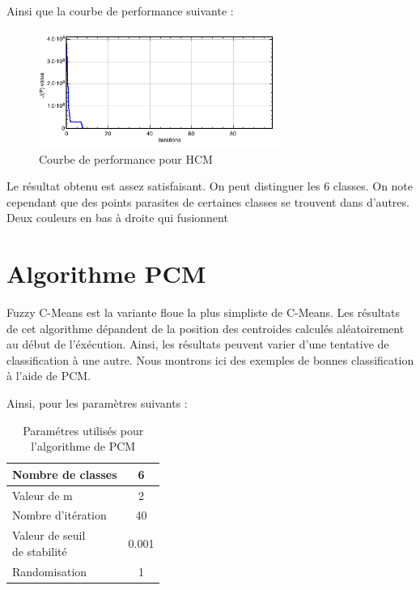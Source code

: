 \documentclass[a4paper,11pt]{article}
\begin{document}
Ainsi que la courbe de performance suivante :

\begin{figure}[H]
\begin{center}
\includegraphics[width=300px]{../img/Perf_HCM.png}
\end{center}
\caption{Courbe de performance pour HCM}
\end{figure}

Le résultat obtenu est assez satisfaisant. On peut distinguer les 6 classes. On note cependant que des points parasites de certaines classes se trouvent dans d'autres. Deux couleurs en bas à droite qui fusionnent

\section{Algorithme PCM}
Fuzzy C-Means est la variante floue la plus simpliste de C-Means. Les résultats de cet algorithme dépandent de la position des centroides calculés aléatoirement au début de l'éxécution. Ainsi, les résultats peuvent varier d'une tentative de classification à une autre. Nous montrons ici des exemples de bonnes classification à l'aide de PCM.

Ainsi, pour les paramètres suivants : 

\begin{table}[H]
  \begin{center}
    \begin{tabular}{|l|c|}
      \hline
      Nombre de classes & 6 \\
      \hline
      Valeur de m & 2 \\
      \hline
      Nombre d'itération & 40 \\
      \hline
      \shortstack{ Valeur de seuil \\ de stabilité }  & 0.001 \\
      \hline
      Randomisation & 1 \\
      \hline
    \end{tabular}
    \caption{Paramétres utilisés pour l'algorithme de PCM}
  \end{center}
\end{table}
\end{document}
